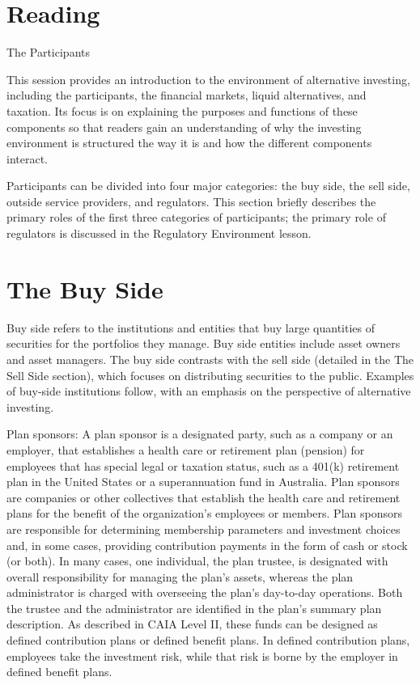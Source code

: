 \documentclass[11pt]{article}
\begin{document}
\section*{Reading}
The Participants

This session provides an introduction to the environment of alternative investing, including the participants, the financial markets, liquid alternatives, and taxation. Its focus is on explaining the purposes and functions of these components so that readers gain an understanding of why the investing environment is structured the way it is and how the different components interact.

Participants can be divided into four major categories: the buy side, the sell side, outside service providers, and regulators. This section briefly describes the primary roles of the first three categories of participants; the primary role of regulators is discussed in the Regulatory Environment lesson.

\section*{The Buy Side}
Buy side refers to the institutions and entities that buy large quantities of securities for the portfolios they manage. Buy side entities include asset owners and asset managers. The buy side contrasts with the sell side (detailed in the The Sell Side section), which focuses on distributing securities to the public. Examples of buy-side institutions follow, with an emphasis on the perspective of alternative investing.

Plan sponsors: A plan sponsor is a designated party, such as a company or an employer, that establishes a health care or retirement plan (pension) for employees that has special legal or taxation status, such as a 401(k) retirement plan in the United States or a superannuation fund in Australia. Plan sponsors are companies or other collectives that establish the health care and retirement plans for the benefit of the organization's employees or members. Plan sponsors are responsible for determining membership parameters and investment choices and, in some cases, providing contribution payments in the form of cash or stock (or both). In many cases, one individual, the plan trustee, is designated with overall responsibility for managing the plan's assets, whereas the plan administrator is charged with overseeing the plan's day-to-day operations. Both the trustee and the administrator are identified in the plan's summary plan description. As described in CAIA Level II, these funds can be designed as defined contribution plans or defined benefit plans. In defined contribution plans, employees take the investment risk, while that risk is borne by the employer in defined benefit plans.
\end{document}
